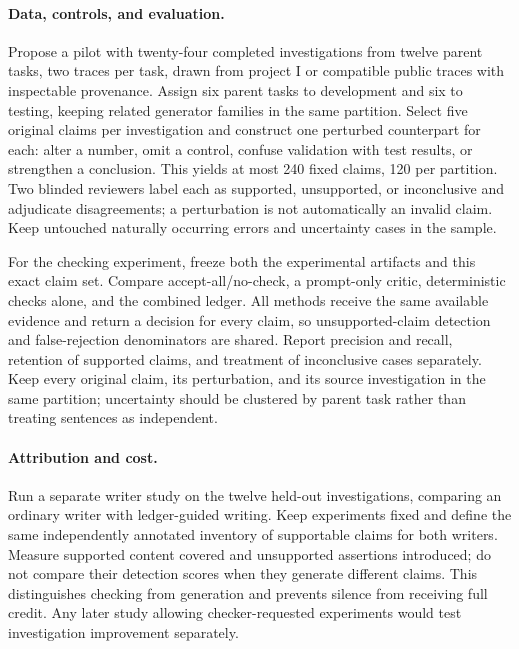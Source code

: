 \paragraph{Data, controls, and evaluation.}
Propose a pilot with twenty-four completed investigations from twelve parent tasks, two traces per task, drawn from project I or compatible public traces with inspectable provenance. Assign six parent tasks to development and six to testing, keeping related generator families in the same partition. Select five original claims per investigation and construct one perturbed counterpart for each: alter a number, omit a control, confuse validation with test results, or strengthen a conclusion. This yields at most 240 fixed claims, 120 per partition. Two blinded reviewers label each as supported, unsupported, or inconclusive and adjudicate disagreements; a perturbation is not automatically an invalid claim. Keep untouched naturally occurring errors and uncertainty cases in the sample.

For the checking experiment, freeze both the experimental artifacts and this exact claim set. Compare accept-all/no-check, a prompt-only critic, deterministic checks alone, and the combined ledger. All methods receive the same available evidence and return a decision for every claim, so unsupported-claim detection and false-rejection denominators are shared. Report precision and recall, retention of supported claims, and treatment of inconclusive cases separately. Keep every original claim, its perturbation, and its source investigation in the same partition; uncertainty should be clustered by parent task rather than treating sentences as independent.

\paragraph{Attribution and cost.}
Run a separate writer study on the twelve held-out investigations, comparing an ordinary writer with ledger-guided writing. Keep experiments fixed and define the same independently annotated inventory of supportable claims for both writers. Measure supported content covered and unsupported assertions introduced; do not compare their detection scores when they generate different claims. This distinguishes checking from generation and prevents silence from receiving full credit. Any later study allowing checker-requested experiments would test investigation improvement separately.

